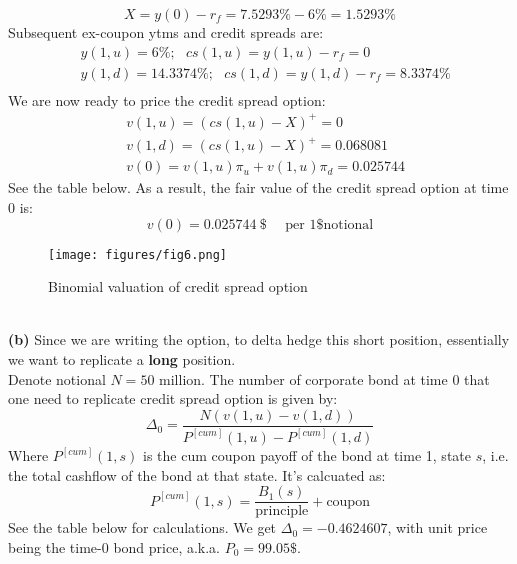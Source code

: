 \documentclass[10 pt]{hwtemplate} %
\begin{document}
\begin{solution}
$$
X = y(0) - r_f = 7.5293\%- 6\% = 1.5293\%
$$
Subsequent ex-coupon ytms and credit spreads are:
\begin{equation}
  \begin{split}
    &y(1,u) = 6\%;~~~cs(1,u) = y(1,u) - r_f = 0\\
    &y(1,d) = 14.3374\%;~~~cs(1,d) = y(1,d) - r_f = 8.3374\%\\
  \end{split}
\end{equation}
We are now ready to price the credit spread option:
\begin{equation}
  \begin{split}
    &v(1,u) = (cs(1,u)-X)^+ = 0\\
    &v(1,d) = (cs(1,u)-X)^+ = 0.068081\\
    &v(0) = v(1,u)\pi_u + v(1,u)\pi_d = 0.025744
  \end{split}
\end{equation}
See the table below. As a result, the fair value of the credit spread option at time 0 is:
\begin{equation}
  v(0) = 0.025744~\$~~~~~~\text{per 1\$ notional}
\end{equation}
\begin{figure}[H]
  \centering
  \captionsetup{justification=centering}
  \caption{Binomial valuation of credit spread option}
  \texttt{[image: figures/fig6.png]}
\end{figure}
~\\
\textbf{(b)} Since we are writing the option, to delta hedge this short position, essentially we want to replicate a \textbf{long} position. \\
Denote notional $N = 50$ million. The number of corporate bond at time 0 that one need to replicate credit spread option is given by:
\begin{equation}
  \Delta_0 = \frac{N(v(1,u)-v(1,d))}{P^{[cum]}(1,u) - P^{[cum]}(1,d)}
\end{equation}
Where $P^{[cum]}(1,s)$ is the cum coupon payoff of the bond at time 1, state $s$, i.e. the total cashflow of the bond at that state. It's calcuated as: 
$$
P^{[cum]}(1,s) = \frac{B_1(s)}{\text{principle}} + \text{coupon}
$$
See the table below for calculations. We get $\Delta_0 = -0.4624607$, with unit price being the time-0 bond price, a.k.a. $P_0 = 99.05\$$. 
\begin{figure}[H]
  \centering
  \captionsetup{justification=centering}

\end{figure}
\end{solution}
\end{document}
